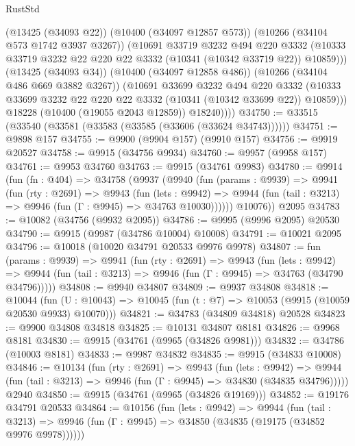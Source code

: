 \begin{lexlean}{RustStd}
\begin{coremodule}
                (@13425 (@34093 @22))
                (@10400 (@34097 @12857 @573))
                (@10266 (@34104 @573 @1742 @3937 @3267))
                (@10691
                  @33719
                  @3232
                  @494
                  @220
                  @3332
                  (@10333 @33719 @3232 @22 @220 @22 @3332 (@10341 (@10342 @33719 @22)) @10859)))
              (@13425 (@34093 @34))
              (@10400 (@34097 @12858 @486))
              (@10266 (@34104 @486 @669 @3882 @3267))
              (@10691
                @33699
                @3232
                @494
                @220
                @3332
                (@10333 @33699 @3232 @22 @220 @22 @3332 (@10341 (@10342 @33699 @22)) @10859)))
            @18228
            (@10400 (@19055 @2043 @12859))
            @18240))))
@34750 := @33515 (@33540 (@33581 (@33583 (@33585 (@33606 (@33624 @34743))))))
@34751 := @9898 @157
@34755 := @9900 (@9904 @157) (@9910 @157)
@34756 := @9919 @20527
@34758 := @9915 (@34756 @9934)
@34760 := @9957 (@9958 @157)
@34761 := @9953 @34760
@34763 := @9915 (@34761 @9983)
@34780 := @9914
    (fun (fn : @404) =>
    @34758
      (@9937
        (@9940
          (fun (params : @9939) =>
          @9941
            (fun (rty : @2691) =>
            @9943
              (fun (lets : @9942) =>
              @9944 (fun (tail : @3213) => @9946 (fun (Γ : @9945) => @34763 @10030))))))
        @10076))
    @2095
@34783 := @10082 (@34756 (@9932 @2095))
@34786 := @9995 (@9996 @2095) @20530
@34790 := @9915 (@9987 (@34786 @10004) @10008)
@34791 := @10021 @2095
@34796 := @10018 (@10020 @34791 @20533 @9976 @9978)
@34807 := fun (params : @9939) =>
  @9941
    (fun (rty : @2691) =>
    @9943
      (fun (lets : @9942) =>
      @9944 (fun (tail : @3213) => @9946 (fun (Γ : @9945) => @34763 (@34790 @34796)))))
@34808 := @9940 @34807
@34809 := @9937 @34808
@34818 := @10044
    (fun (U : @10043) => @10045 (fun (t : @7) => @10053 (@9915 (@10059 @20530 @9933) @10070)))
@34821 := @34783 (@34809 @34818) @20528
@34823 := @9900 @34808 @34818
@34825 := @10131 @34807 @8181
@34826 := @9968 @8181
@34830 := @9915 (@34761 (@9965 (@34826 @9981)))
@34832 := @34786 (@10003 @8181)
@34833 := @9987 @34832
@34835 := @9915 (@34833 @10008)
@34846 := @10134
    (fun (rty : @2691) =>
    @9943
      (fun (lets : @9942) =>
      @9944 (fun (tail : @3213) => @9946 (fun (Γ : @9945) => @34830 (@34835 @34796)))))
    @2940
@34850 := @9915 (@34761 (@9965 (@34826 @19169)))
@34852 := @19176 @34791 @20533
@34864 := @10156
    (fun (lets : @9942) =>
    @9944
      (fun (tail : @3213) =>
      @9946 (fun (Γ : @9945) => @34850 (@34835 (@19175 (@34852 @9976 @9978))))))

\end{coremodule}
\end{lexlean}
